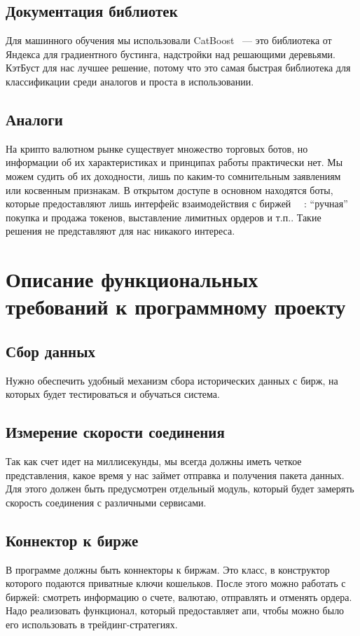 \documentclass{article}
\begin{document}
\subsection{Документация библиотек}
Для машинного обучения мы использовали CatBoost~\cite{CatboostDocs} — это библиотека от Яндекса для градиентного бустинга, надстройки над решающими деревьями. КэтБуст для нас лучшее решение, потому что это самая быстрая библиотека для классификации среди аналогов и проста в использовании.

\subsection{Аналоги}
На крипто валютном рынке существует множество торговых ботов, но информации об их характеристиках и принципах работы практически нет. Мы можем судить об их доходности, лишь по каким-то сомнительным заявлениям или косвенным признакам. В открытом доступе в основном находятся боты, которые предоставляют лишь интерфейс взаимодействия с биржей ~\cite{CryptoTradingBot}~\cite{FreqTrade}: “ручная” покупка и продажа токенов, выставление лимитных ордеров и т.п.. Такие решения не представляют для нас никакого интереса.


\section{Описание функциональных требований к программному проекту}

\subsection{Сбор данных}
Нужно обеспечить удобный механизм сбора исторических данных с бирж, на которых будет тестироваться и обучаться система.

\subsection{Измерение скорости соединения}
Так как счет идет на миллисекунды, мы всегда должны иметь четкое представления, какое время у нас займет отправка и получения пакета данных. Для этого должен быть предусмотрен отдельный модуль, который будет замерять скорость соединения с различными сервисами.

\subsection{Коннектор к бирже}
В программе должны быть коннекторы к биржам. Это класс, в конструктор которого подаются приватные ключи кошельков. После этого можно работать с биржей: смотреть информацию о счете, валютаю, отправлять и отменять ордера. Надо реализовать функционал, который предоставляет апи, чтобы можно было его использовать в трейдинг-стратегиях.
\end{document}
